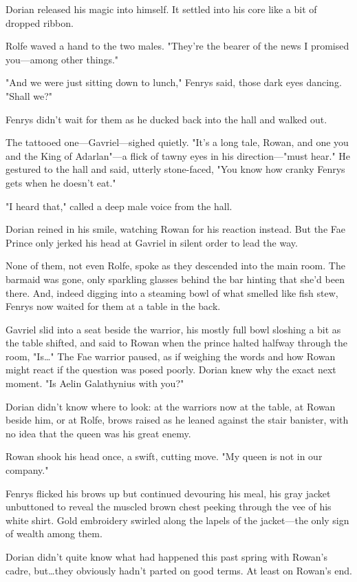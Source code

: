 Dorian released his magic into himself.
It settled into his core like a bit of dropped ribbon.

Rolfe waved a hand to the two males.
"They're the bearer of the news I promised you---among other things."

"And we were just sitting down to lunch," Fenrys said, those dark eyes dancing.
"Shall we?"

Fenrys didn't wait for them as he ducked back into the hall and walked out.

The tattooed one---Gavriel---sighed quietly.
"It's a long tale, Rowan, and one you and the King of Adarlan"---a flick of tawny eyes in his direction---"must hear."
He gestured to the hall and said, utterly stone-faced, "You know how cranky Fenrys gets when he doesn't eat."

"I heard that," called a deep male voice from the hall.

Dorian reined in his smile, watching Rowan for his reaction instead.
But the Fae Prince only jerked his head at Gavriel in silent order to lead the way.

None of them, not even Rolfe, spoke as they descended into the main room.
The barmaid was gone, only sparkling glasses behind the bar hinting that she'd been there.
And, indeed digging into a steaming bowl of what smelled like fish stew, Fenrys now waited for them at a table in the back.

Gavriel slid into a seat beside the warrior, his mostly full bowl sloshing a bit as the table shifted, and said to Rowan when the prince halted halfway through the room, "Is\ldots" The Fae warrior paused, as if weighing the words and how Rowan might react if the question was posed poorly.
Dorian knew why the exact next moment.
"Is Aelin Galathynius with you?"

Dorian didn't know where to look: at the warriors now at the table, at Rowan beside him, or at Rolfe, brows raised as he leaned against the stair banister, with no idea that the queen was his great enemy.

Rowan shook his head once, a swift, cutting move.
"My queen is not in our company."

Fenrys flicked his brows up but continued devouring his meal, his gray jacket unbuttoned to reveal the muscled brown chest peeking through the vee of his white shirt.
Gold embroidery swirled along the lapels of the jacket---the only sign of wealth among them.

Dorian didn't quite know what had happened this past spring with Rowan's cadre, but\ldots they obviously hadn't parted on good terms.
At least on Rowan's end.

